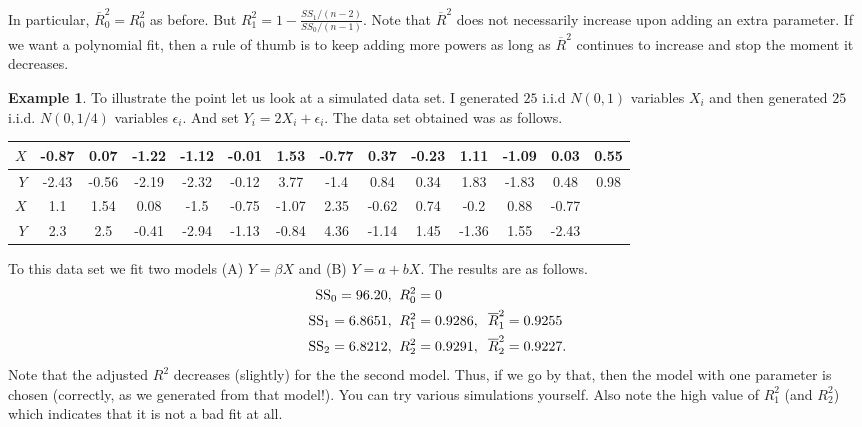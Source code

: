 \documentclass[preprint,  11pt]{amsart}
\theoremstyle{plain} %
\theoremstyle{definition} %
\newtheorem{example}[theorem]{Example}
\begin{document}
In particular, $\overline{R}_{0}^{2}=R_{0}^{2}$ as before. But $R_{1}^{2}=1-\frac{SS_{1}/(n-2)}{SS_{0}/(n-1)}$. Note that $\overline{R}^{2}$ does not necessarily increase upon adding an extra parameter. If we want a polynomial fit, then a rule of thumb is to keep adding more powers as long as $\overline{R}^{2}$ continues to increase and stop the moment it decreases.
\begin{example} To illustrate the point let us look at a simulated data set. I generated $25$ i.i.d $N(0,1)$ variables $X_{i}$ and then generated $25$ i.i.d. $N(0,1/4)$ variables $\epsilon_{i}$. And set $Y_{i}=2X_{i}+\epsilon_{i}$. The  data set obtained was as follows.
\begin{center}
\begin{tabular}{||r|c|c|c|c|c|c|c|c|c|c|c|c|c||}
\hline
$X$  & -0.87&0.07&-1.22&-1.12&-0.01&1.53&-0.77&0.37&-0.23&1.11&-1.09&0.03&0.55 \\
\hline
$Y$  & -2.43&-0.56&-2.19&-2.32&-0.12&3.77&-1.4&0.84&0.34&1.83&-1.83&0.48&0.98 \\
\hline
\hline
$X$ & 1.1&1.54&0.08&-1.5&-0.75&-1.07&2.35&-0.62&0.74&-0.2&0.88&-0.77 &\\
\hline
$Y$ & 2.3&2.5&-0.41&-2.94&-1.13&-0.84&4.36&-1.14&1.45&-1.36&1.55&-2.43  &  \\
\hline
\hline
\end{tabular}
\end{center}
To this data set we fit two models (A) $Y=\beta X$ and (B) $Y=a+bX$. The results are as follows.
\begin{align*}
\mbox{SS}_{0}=96.20, &\;\;  R_{0}^{2}=0 \\
\mbox{SS}_{1}=6.8651, &\;\;  R_{1}^{2}=0.9286, \hspace{2mm} \overline{R}_{1}^{2}=0.9255 \\
\mbox{SS}_{2}= 6.8212, &\;\; R_{2}^{2}=0.9291, \hspace{2mm} \overline{R}_{2}^{2}=0.9227.
\end{align*}
Note that the adjusted $R^{2}$ decreases (slightly) for the the second model. Thus, if we go by that, then the model with one parameter is chosen (correctly, as we generated from that model!). You can try various simulations yourself. Also note the high value of $R_{1}^{2}$ (and $R_{2}^{2}$) which indicates that it is not a bad fit at all.
\end{example}

\end{document}
